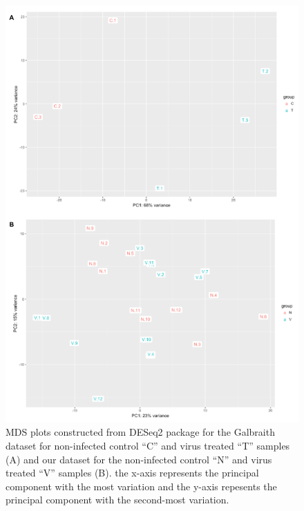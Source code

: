 \documentclass[11pt,a4paper,oldfontcommands,openany]{memoir}
\numberwithin{equation}{section} %
\begin{document}
\begin{figure}[H]
  \includegraphics[width=\textwidth]{Images/mdsPlots}
  \caption{MDS plots constructed from DESeq2 package for the Galbraith dataset for non-infected control ``C'' and virus treated ``T'' samples (A) and our dataset for the non-infected control ``N'' and virus treated ``V'' samples (B). the x-axis represents the principal component with the most variation and the y-axis repesents the principal component with the second-most variation.}
  \label{fig:mdsPlots}
\end{figure}
\end{document}
